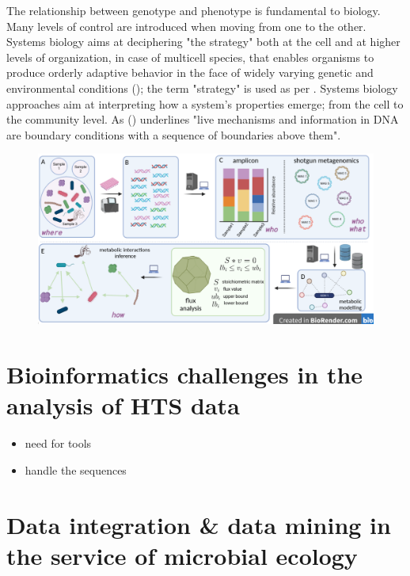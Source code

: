       The relationship between genotype and phenotype is fundamental to biology.
      Many levels of control are introduced when moving from one to the other. 
      Systems biology aims at deciphering "the strategy" both at the cell and at higher levels of organization, in case of multicell species, that enables organisms to produce orderly adaptive behavior in the face of widely varying genetic and environmental conditions (\cite{strohman2002maneuvering}); 
      the term "strategy" is used as per \cite{polanyi1968life}.
      Systems biology approaches aim at interpreting how a system's properties emerge; 
      from the cell to the community level.
      As \citeauthor{polanyi1968life} (\citeyear{polanyi1968life}) underlines 
      "live mechanisms and information in DNA are boundary conditions with a sequence of boundaries above them". 
      \begin{figure}[h]
         \centering
         \includegraphics[width=135mm]{figures/Selection_935.png}
         \caption[Reverse ecology approach]{}
      \end{figure}

   







\section{Bioinformatics challenges in the analysis of HTS data}
      
      
   \begin{itemize}
      \item need for tools 
      \item handle the sequences 
   \end{itemize}


\section{Data integration \& data mining in the service of microbial ecology}


